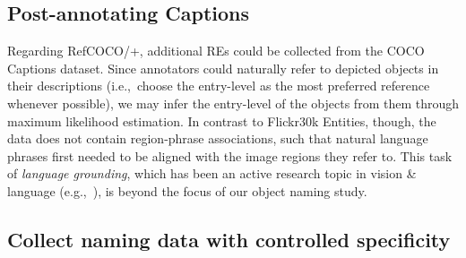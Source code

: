 \documentclass[runningheads]{llncs}
\newcommand{\refcoco}{RefCOCO\xspace}
\newcommand{\flickr}{Flickr30k Entities\xspace}
\begin{document}
\subsection{Post-annotating Captions}
Regarding \refcoco/+, additional REs could be collected from the COCO Captions dataset. %
Since annotators could naturally refer to depicted objects in their descriptions (i.e.,~choose the entry-level as the most preferred reference whenever possible), we may infer the entry-level of the objects from them through maximum likelihood estimation. 
%
In contrast to \flickr, though, the data does not contain region-phrase associations,  %
such that natural language phrases first needed to be aligned with the image regions they refer to. 
This task of \textit{language grounding}, which has been an active research topic in vision \& language (e.g.,~\cite{kong2014what,karpathy2015deep,rohrbach2016grounding}), is beyond the focus of our object naming study. 

\subsection{Collect naming data with controlled specificity}


%


\clearpage


\end{document}
